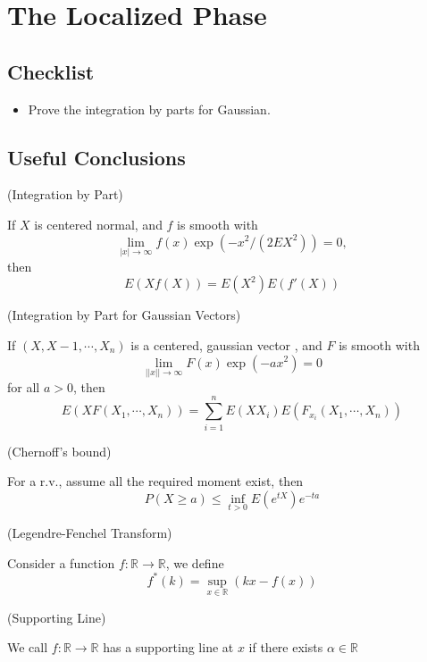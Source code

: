 \section{The Localized Phase}

\subsection{Checklist}
\begin{itemize}
    \item Prove the integration by parts for Gaussian.
\end{itemize}

\subsection{Useful Conclusions}

\begin{lemma}
    (Integration by Part)\par
    If $X$ is centered normal, and $f$ is smooth with
    \[
    \lim_{|x|\to\infty} f(x)\exp(-x^2/(2EX^2)) = 0,
    \]
    then
    \[E(Xf(X)) = E(X^2)E(f'(X))\]
\end{lemma}

\begin{corollary}
    (Integration by Part for Gaussian Vectors)\par If $(X,X-1,\cdots,X_n)$ is a centered, gaussian vector , and $F$ is smooth with
    \[
    \lim_{||x||\to\infty} F(x)\exp(-ax^2) = 0
    \]
    for all $a>0$, then
    \[
    E(XF(X_1,\cdots,X_n)) = \sum\limits_{i=1}^n E(XX_i)E(F_{x_i}(X_1,\cdots,X_n))
    \]
\end{corollary}

\begin{theorem}
    (Chernoff's bound)\par
    For a r.v., assume all the required moment exist, then
    \[
    P(X\geq a) \leq \inf_{t>0}E(e^{tX})e^{-ta}
    \]
\end{theorem}

\begin{definition}
    (Legendre-Fenchel Transform)\par
    Consider a function $f:\mathbb{R}\to\mathbb{R}$, we define
    \[
    f^*(k) = \sup_{x\in \mathbb{R}}(kx-f(x))
    \]
\end{definition}

\begin{definition}
    (Supporting Line)\par
    We call $f:\mathbb{R}\to\mathbb{R}$ has a supporting line at $x$ if there exists $\alpha \in \mathbb{R}$
\end{definition}


